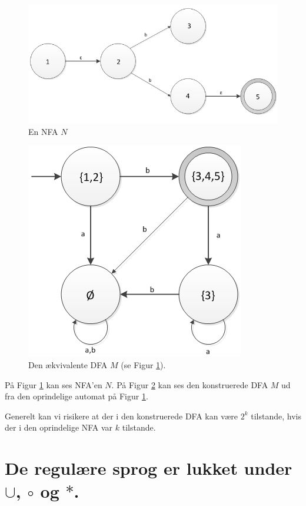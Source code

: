 \documentclass[a4paper,10pt,article]{memoir}
\begin{document}
\begin{eksempel}
\begin{figure}[h]
\centering
\includegraphics[scale=0.8]{figur7.png}
\caption{En NFA $N$}
\label{fig:7}
\end{figure}

\begin{figure}[h]
\centering
\includegraphics[scale=0.8]{figur8.png}
\caption{Den ækvivalente DFA $M$ (se Figur \ref{fig:7}).}
\label{fig:8}
\end{figure}

På Figur \ref{fig:7} kan ses NFA'en $N$. På Figur \ref{fig:8} kan ses den konstruerede DFA $M$ ud fra den oprindelige automat på Figur \ref{fig:7}.

Generelt kan vi risikere at der i den konstruerede DFA kan være $2^k$ tilstande, hvis der i den oprindelige NFA var $k$ tilstande.
\end{eksempel}

\chapter{De regulære sprog er lukket under $\cup$, $\circ$ og $\ast$.}
\end{document}

